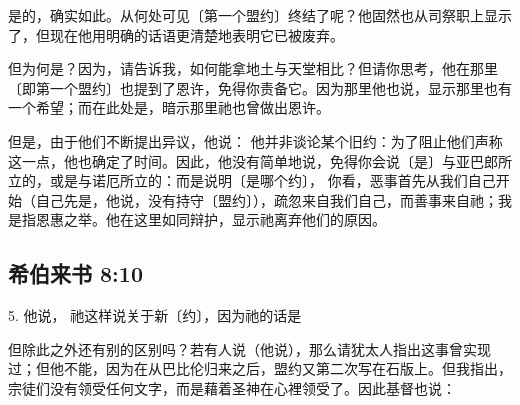 是的，确实如此。从何处可见〔第一个盟约〕终结了呢？他固然也从司祭职上显示了，但现在他用明确的话语更清楚地表明它已被废弃。\par

但为何是？因为，请告诉我，如何能拿地土与天堂相比？但请你思考，他在那里〔即第一个盟约〕也提到了恩许，免得你责备它。因为那里他也说，显示那里也有一个希望；而在此处是，暗示那里祂也曾做出恩许。\par

但是，由于他们不断提出异议，他说： 他并非谈论某个旧约：为了阻止他们声称这一点，他也确定了时间。因此，他没有简单地说，免得你会说〔是〕与亚巴郎所立的，或是与诺厄所立的：而是说明〔是哪个约〕， 你看，恶事首先从我们自己开始（自己先是，他说，没有持守〔盟约〕），疏忽来自我们自己，而善事来自祂；我是指恩惠之举。他在这里如同辩护，显示祂离弃他们的原因。\par


\subsection{希伯来书 8:10}

5.  他说， 祂这样说关于新〔约〕，因为祂的话是\par

但除此之外还有别的区别吗？若有人说（他说），那么请犹太人指出这事曾实现过；但他不能，因为在从巴比伦归来之后，盟约又第二次写在石版上。但我指出，宗徒们没有领受任何文字，而是藉着圣神在心裡领受了。因此基督也说：\par


